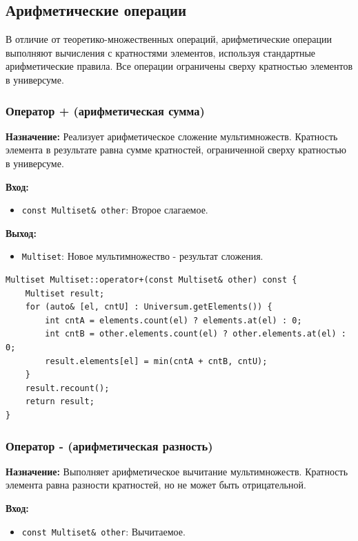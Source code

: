 \subsection{Арифметические операции}

В отличие от теоретико-множественных операций, арифметические операции выполняют вычисления с кратностями элементов, используя стандартные арифметические правила. Все операции ограничены сверху кратностью элементов в универсуме.

\subsubsection{Оператор + (арифметическая сумма)}

\textbf{Назначение:} Реализует арифметическое сложение мультимножеств. Кратность элемента в результате равна сумме кратностей, ограниченной сверху кратностью в универсуме.

\textbf{Вход:}
\begin{itemize}
    \item \texttt{const Multiset\& other}: Второе слагаемое.
\end{itemize}

\textbf{Выход:}
\begin{itemize}
    \item \texttt{Multiset}: Новое мультимножество - результат сложения.
\end{itemize}

\begin{lstlisting}[style=cstyle, caption={Реализация operator+()}]
Multiset Multiset::operator+(const Multiset& other) const {
    Multiset result;
    for (auto& [el, cntU] : Universum.getElements()) {
        int cntA = elements.count(el) ? elements.at(el) : 0;
        int cntB = other.elements.count(el) ? other.elements.at(el) : 0;
        result.elements[el] = min(cntA + cntB, cntU);
    }
    result.recount();
    return result;
}
\end{lstlisting}

\subsubsection{Оператор - (арифметическая разность)}

\textbf{Назначение:} Выполняет арифметическое вычитание мультимножеств. Кратность элемента равна разности кратностей, но не может быть отрицательной.

\textbf{Вход:}
\begin{itemize}
    \item \texttt{const Multiset\& other}: Вычитаемое.
\end{itemize}

